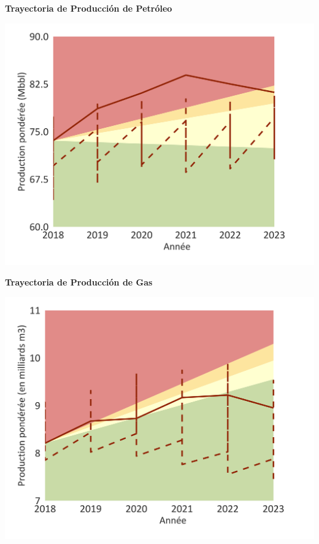 \documentclass[10pt,table]{article}\usepackage[]{graphicx}\usepackage[]{color}
\begin{document}
	
	\begin{minipage}[t]{.49\linewidth}
		\textbf{Trayectoria de Producción de Petróleo }
		
		\includegraphics[trim = {0 0cm 0 0},width=1\linewidth]{ReportOutputs/Fig21}
		
	\end{minipage}	
	\hspace{.02\linewidth}
	\begin{minipage}[t]{.49\textwidth}
		\textbf{Trayectoria de Producción de Gas}
		
		\includegraphics[trim = {0 0cm 0 0},width=1\linewidth]{ReportOutputs/Fig22}
		
	\end{minipage}
	
\end{document}
